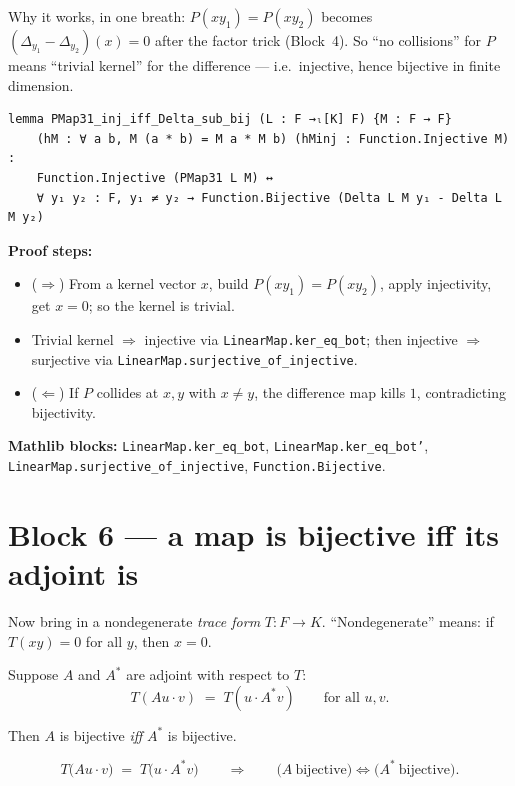 \documentclass[11pt]{article}
\begin{document}
Why it works, in one breath:
$P(xy_1)=P(xy_2)$ becomes $(\Delta_{y_1}-\Delta_{y_2})(x)=0$ after the factor
trick (Block~4).  So ``no collisions'' for $P$ means ``trivial kernel'' for the
difference --- i.e.\ injective, hence bijective in finite dimension.

\begin{lstlisting}
lemma PMap31_inj_iff_Delta_sub_bij (L : F →ₗ[K] F) {M : F → F}
    (hM : ∀ a b, M (a * b) = M a * M b) (hMinj : Function.Injective M) :
    Function.Injective (PMap31 L M) ↔
    ∀ y₁ y₂ : F, y₁ ≠ y₂ → Function.Bijective (Delta L M y₁ - Delta L M y₂)
\end{lstlisting}

\textbf{Proof steps:}
\begin{itemize}
  \item ($\Rightarrow$) From a kernel vector $x$, build
        $P(xy_1)=P(xy_2)$, apply injectivity, get $x=0$;
        so the kernel is trivial.
  \item Trivial kernel $\Rightarrow$ injective via
        \texttt{LinearMap.ker\_eq\_bot}; then injective $\Rightarrow$
        surjective via \texttt{LinearMap.surjective\_of\_injective}.
  \item ($\Leftarrow$) If $P$ collides at $x,y$ with $x\neq y$, the
        difference map kills $1$, contradicting bijectivity.
\end{itemize}

\textbf{Mathlib blocks:}
\texttt{LinearMap.ker\_eq\_bot}, \texttt{LinearMap.ker\_eq\_bot'},
\texttt{LinearMap.surjective\_of\_injective}, \texttt{Function.Bijective}.

\section{Block 6 --- a map is bijective iff its adjoint is}

Now bring in a nondegenerate \emph{trace form} $T : F \to K$.
``Nondegenerate'' means: if $T(xy)=0$ for all $y$, then $x=0$.

Suppose $A$ and $A^{*}$ are adjoint with respect to $T$:
\[
  T(A u \cdot v) \;=\; T(u \cdot A^{*} v) \qquad \text{for all } u,v.
\]

Then $A$ is bijective \emph{iff} $A^{*}$ is bijective.

\[
  T\bigl(A u \cdot v\bigr) \;=\; T\bigl(u \cdot A^{*} v\bigr)
  \qquad\Longrightarrow\qquad
  \bigl(A\ \text{bijective}\bigr) \Leftrightarrow \bigl(A^{*}\ \text{bijective}\bigr).
\]
\end{document}
